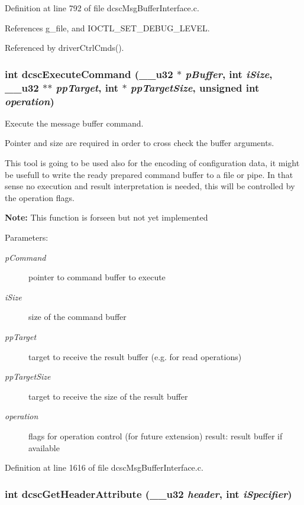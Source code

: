 Definition at line 792 of file dcsc\-Msg\-Buffer\-Interface.c.

References g\_\-file, and IOCTL\_\-SET\_\-DEBUG\_\-LEVEL.

Referenced by driver\-Ctrl\-Cmds().\hypertarget{group__dcsc__msg__buffer__access_g96f1fe73877d927a698a396df555767e}{
\subsubsection[dcscExecuteCommand]{\setlength{\rightskip}{0pt plus 5cm}int dcsc\-Execute\-Command (\_\-\_\-u32 $\ast$ {\em p\-Buffer}, int {\em i\-Size}, \_\-\_\-u32 $\ast$$\ast$ {\em pp\-Target}, int $\ast$ {\em pp\-Target\-Size}, unsigned int {\em operation})}}
\label{group__dcsc__msg__buffer__access_g96f1fe73877d927a698a396df555767e}


Execute the message buffer command. 

Pointer and size are required in order to cross check the buffer arguments.\par
 This tool is going to be used also for the encoding of configuration data, it might be usefull to write the ready prepared command buffer to a file or pipe. In that sense no execution and result interpretation is needed, this will be controlled by the operation flags.\par
 {\bf Note:} This function is forseen but not yet implemented \begin{Desc}
\item[Parameters:]
\begin{description}
\item[{\em p\-Command}]pointer to command buffer to execute \item[{\em i\-Size}]size of the command buffer \item[{\em pp\-Target}]target to receive the result buffer (e.g. for read operations) \item[{\em pp\-Target\-Size}]target to receive the size of the result buffer \item[{\em operation}]flags for operation control (for future extension) result: result buffer if available \end{description}
\end{Desc}


Definition at line 1616 of file dcsc\-Msg\-Buffer\-Interface.c.\hypertarget{group__dcsc__msg__buffer__access_g975e68b162a4d0786e1902c895349b02}{
\subsubsection[dcscGetHeaderAttribute]{\setlength{\rightskip}{0pt plus 5cm}int dcsc\-Get\-Header\-Attribute (\_\-\_\-u32 {\em header}, int {\em i\-Specifier})}}
\label{group__dcsc__msg__buffer__access_g975e68b162a4d0786e1902c895349b02}



